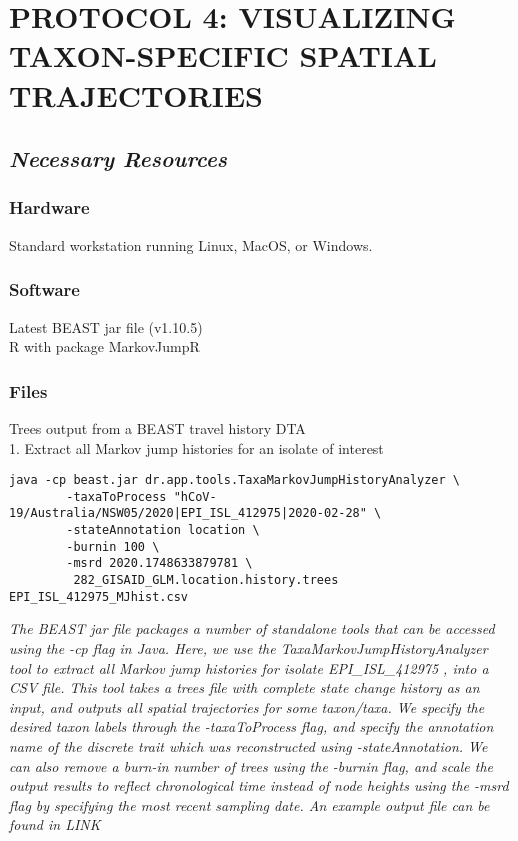 \documentclass{article}
\newcommand{\ann}[1]{
\begin{adjustwidth}{0.5cm}{}
\it{#1}\\
\end{adjustwidth}}
\begin{document}
\section*{PROTOCOL 4: VISUALIZING TAXON-SPECIFIC SPATIAL TRAJECTORIES}
\subsection*{\textbf{\textit{Necessary Resources}}}
\subsubsection*{Hardware}
Standard workstation running Linux, MacOS, or Windows. 

\subsubsection*{Software}
Latest BEAST jar file (v1.10.5)\\
R with package MarkovJumpR

\subsubsection*{Files}
Trees output from a BEAST travel history DTA \\

1. Extract all Markov jump histories for an isolate of interest
\begin{verbatim}
java -cp beast.jar dr.app.tools.TaxaMarkovJumpHistoryAnalyzer \ 
        -taxaToProcess "hCoV-19/Australia/NSW05/2020|EPI_ISL_412975|2020-02-28" \ 
        -stateAnnotation location \
        -burnin 100 \ 
        -msrd 2020.1748633879781 \ 
         282_GISAID_GLM.location.history.trees EPI_ISL_412975_MJhist.csv
\end{verbatim}

\ann{The BEAST jar file packages a number of standalone tools that can be accessed using the -cp flag in Java. Here, we use the TaxaMarkovJumpHistoryAnalyzer tool to extract all Markov jump histories for isolate EPI\_ISL\_412975 , into a CSV file. This tool takes a trees file with complete state change history as an input, and outputs all spatial trajectories for some taxon/taxa. We specify the desired taxon labels through the -taxaToProcess  flag, and specify the annotation name of the discrete trait which was reconstructed using -stateAnnotation.  We can also remove a burn-in number of trees using the -burnin  flag, and scale the output results to reflect chronological time instead of node heights using the -msrd  flag by specifying the most recent sampling date. An example output file can be found in LINK}
\end{document}

